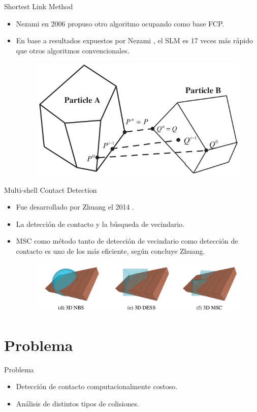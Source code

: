 \documentclass[11pt]{beamer}
\begin{document}
\begin{frame}{Shortest Link Method}
 \begin{itemize}
  \item Nezami en 2006 \cite{2006-Nezami} propuso otro algoritmo ocupando como base FCP.
  \item En base a resultados expuestos por Nezami \cite{2006-Nezami}, el SLM es 17 veces más rápido que otros algoritmos convencionales.
  \begin{figure}[\centering]
  \includegraphics[width=0.5\linewidth]{img/SLM}
  \end{figure}
 \end{itemize}
\end{frame}

\begin{frame}{Multi-shell Contact Detection}
 \begin{itemize}
  \item Fue desarrollado por Zhuang el 2014 \cite{2014-Zhuang}.
  \item La detección de contacto y la búsqueda de vecindario.
  \item MSC como método tanto de detección de vecindario como detección de contacto es uno de los más eficiente, según concluye Zhuang.
  \begin{figure}[\centering]
   \includegraphics[width=0.8\linewidth]{img/Multi-shell}
  \end{figure}
 \end{itemize}
\end{frame}

\section{Problema}
\begin{frame}{Problema}
    \begin{itemize}
        \item Detección de contacto computacionalmente costoso.
        \item Análisis de distintos tipos de colisiones.
    \end{itemize}
\end{frame}
\end{document}
